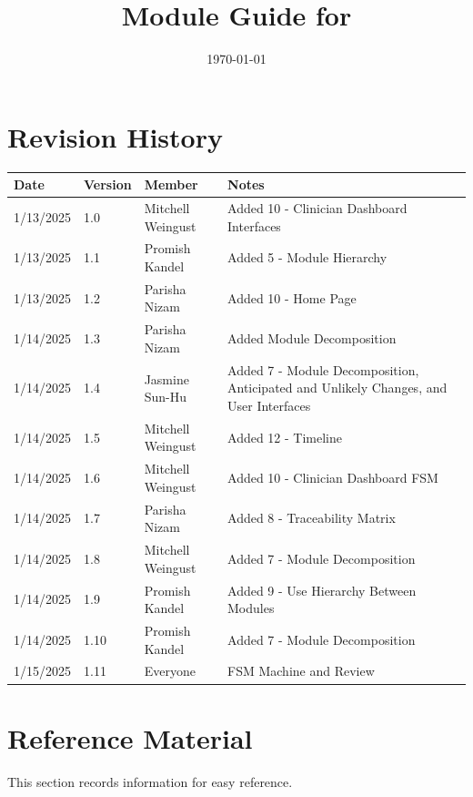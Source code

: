 \documentclass[12pt, titlepage]{article}
\begin{document}
\title{Module Guide for \progname{}} 
\author{\authname}
\date{\today}

\maketitle


\section{Revision History}

\begin{tabularx}{\textwidth}{p{3cm}p{2cm}p{3cm}X}
  \toprule {\bf Date} & {\bf Version} & {\bf Member} & {\bf Notes}\\
  \midrule
  1/13/2025 & 1.0 & Mitchell Weingust & Added 10 - Clinician Dashboard Interfaces\\
  1/13/2025 & 1.1 & Promish Kandel & Added 5 - Module Hierarchy\\
  1/13/2025 & 1.2 & Parisha Nizam & Added 10 - Home Page \\
  1/14/2025 & 1.3 & Parisha Nizam & Added Module Decomposition\\
  1/14/2025 & 1.4 & Jasmine Sun-Hu & Added 7 - Module Decomposition, Anticipated and Unlikely Changes, and User Interfaces\\
  1/14/2025 & 1.5 & Mitchell Weingust & Added 12 - Timeline\\
  1/14/2025 & 1.6 & Mitchell Weingust & Added 10 - Clinician Dashboard FSM\\
  1/14/2025 & 1.7 & Parisha Nizam & Added 8 - Traceability Matrix\\
  1/14/2025 & 1.8 & Mitchell Weingust & Added 7 - Module Decomposition\\
  1/14/2025 & 1.9 & Promish Kandel & Added 9 - Use Hierarchy Between Modules\\
  1/14/2025 & 1.10 & Promish Kandel & Added 7 - Module Decomposition\\
  1/15/2025 & 1.11 & Everyone & FSM Machine and Review \\
  \bottomrule
\end{tabularx}

\newpage

\section{Reference Material}

This section records information for easy reference.
\end{document}
